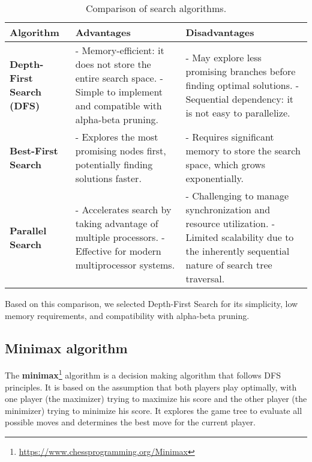 \begin{table}[H]
\centering
\begin{tabular}{|p{3.5cm}|p{4.5cm}|p{4.5cm}|}
\hline
\textbf{Algorithm} & \textbf{Advantages} & \textbf{Disadvantages} \\ \hline
\textbf{Depth-First Search (DFS)} 
& 
- Memory-efficient: it does not store the entire search space. \newline 
- Simple to implement and compatible with alpha-beta pruning. 
& 
- May explore less promising branches before finding optimal solutions.
\newline
- Sequential dependency: it is not easy to parallelize. \\ \hline

\textbf{Best-First Search} 
& 
- Explores the most promising nodes first, potentially finding solutions faster. 
& 
- Requires significant memory to store the search space, which grows exponentially. \newline \\ \hline

\textbf{Parallel Search} 
& 
- Accelerates search by taking advantage of multiple processors. \newline 
- Effective for modern multiprocessor systems. 
& 
- Challenging to manage synchronization and resource utilization. \newline 
- Limited scalability due to the inherently sequential nature of search tree traversal. \\ \hline
\end{tabular}
\caption{Comparison of search algorithms.}
\label{tab:search-algorithms}
\end{table}

Based on this comparison, we selected Depth-First Search for its simplicity, low memory requirements, and compatibility with alpha-beta pruning.

\subsection{Minimax algorithm}

The \textbf{minimax}\footnote{\url{https://www.chessprogramming.org/Minimax}} algorithm is a decision making algorithm that follows DFS principles. It is based on the assumption that both players play optimally, with one player (the maximizer) trying to maximize his score and the other player (the minimizer) trying to minimize his score. It explores the game tree to evaluate all possible moves and determines the best move for the current player.

